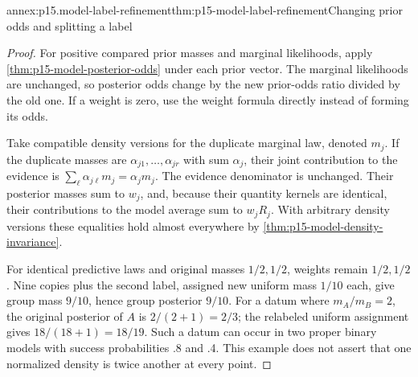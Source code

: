 \begin{annexitem}{annex:p15.model-label-refinement}{thm:p15-model-label-refinement}{Changing prior odds and splitting a label}
\begin{proof}
For positive compared prior masses and marginal likelihoods, apply
\cref{thm:p15-model-posterior-odds} under each prior vector.
The marginal likelihoods are unchanged, so posterior odds change by the
new prior-odds ratio divided by the old one. If a weight is zero, use the
weight formula directly instead of forming its odds.

Take compatible density versions for the duplicate marginal law, denoted
\(m_j\). If the duplicate masses are \(\alpha_{j1},\ldots,\alpha_{jr}\)
with sum \(\alpha_j\), their joint contribution to the evidence is
\(\sum_\ell\alpha_{j\ell}m_j=\alpha_jm_j\). The evidence denominator
is unchanged. Their posterior masses sum to \(w_j\), and, because their
quantity kernels are identical, their contributions to the model average
sum to \(w_jR_j\). With arbitrary density versions these equalities hold
almost everywhere by \cref{thm:p15-model-density-invariance}.

For identical predictive laws and original masses \(1/2,1/2\), weights
remain \(1/2,1/2\). Nine copies plus the second label, assigned new
uniform mass \(1/10\) each, give group mass \(9/10\), hence group
posterior \(9/10\). For a datum where \(m_A/m_B=2\), the original
posterior of \(A\) is \(2/(2+1)=2/3\); the relabeled uniform assignment
gives \(18/(18+1)=18/19\). Such a datum can occur in two proper binary
models with success probabilities .8 and .4. This example does not
assert that one normalized density is twice another at every point.
\end{proof}
\end{annexitem}


